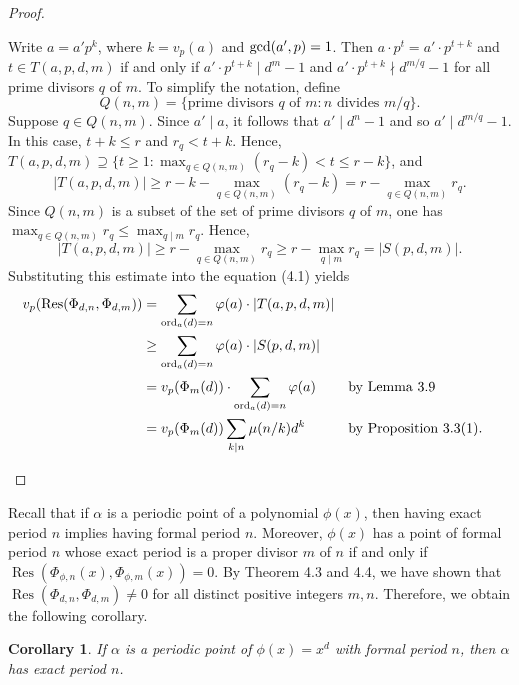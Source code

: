 \documentclass[10pt,leqno]{amsart}
\newtheorem{corollary}[theorem]{Corollary}
\theoremstyle{definition}
\theoremstyle{remark}
\numberwithin{equation}{section}
\def\gcd{{\rm gcd}}
\def\ord{{\rm ord}}
\newcommand{\res}{\operatorname{Res}}
\begin{document}
\begin{proof}
\begin{enumerate}
        Write $a = a'p^k$, where $k = v_p(a)$ and $\gcd(a',p) = 1$. Then $a\cdot p^t = a'\cdot p^{t+k}$ and 
        $t\in T(a,p,d,m)$ if and only if $a'\cdot p^{t+k}\mid d^m-1$ and $a'\cdot p^{t+k}\nmid d^{m/q}-1$ for all prime divisors $q$ of $m$. To simplify the notation, define
        $$Q(n,m) = \{\text{prime divisors }q\text{ of }m:n\text{ divides }m/q\}.$$
        Suppose $q\in Q(n,m)$. Since $a'\mid a$, it follows that $a'\mid d^n-1$ and so $a'\mid d^{m/q}-1$. In this case, $t+k\leq r$ and $r_q<t+k$. Hence, $T(a,p,d,m)\supseteq \{t\geq 1:\max_{q\in Q(n,m)}(r_q-k)<t\leq r-k\}$, and
        $$|T(a,p,d,m)|\geq r-k-\max_{q\in Q(n,m)}(r_q-k) = r-\max_{q\in Q(n,m)}r_q.$$
        Since $Q(n,m)$ is a subset of the set of prime divisors $q$ of $m$, one has $\max_{q\in Q(n,m)}r_q\leq \max_{q\mid m}r_q$. Hence, 
        $$|T(a,p,d,m)| \geq r-\max_{q\in Q(n,m)}r_q\geq r-\max_{q\mid m}r_q = |S(p,d,m)|.$$
        Substituting this estimate into the equation (4.1) yields
        \begin{align*}
            v_p(\res(\Phi_{d,n},\Phi_{d,m})) &= \sum_{\ord_a(d) = n}\varphi(a)\cdot|T(a,p,d,m)|\\
            &\geq \sum_{\ord_a(d) = n}\varphi(a)\cdot|S(p,d,m)|\\
            &= v_p(\Phi_{m}(d))\cdot\sum_{\ord_a(d) = n}\varphi(a)&&\text{by Lemma 3.9}\\
            &= v_p(\Phi_m(d))\sum_{k\mid n}\mu(n/k)d^k&&\text{by Proposition 3.3(1)}.
        \end{align*}
    \end{enumerate}
\end{proof}

Recall that if $\alpha$ is a periodic point of a polynomial $\phi(x)$, then having exact period $n$ implies having formal period $n$. Moreover, $\phi(x)$ has a point of formal period $n$ whose exact period is a proper divisor $m$ of $n$ if and only if $\res(\Phi_{\phi,n}(x),\Phi_{\phi,m}(x)) = 0$. By Theorem 4.3 and 4.4, we have shown that $\res(\Phi_{d,n},\Phi_{d,m})\neq 0$ for all distinct positive integers $m,n$. Therefore, we obtain the following corollary.

\begin{corollary}
    If $\alpha$ is a periodic point of $\phi(x) = x^d$ with formal period $n$, then $\alpha$ has exact period $n$.
\end{corollary}



\end{document}
